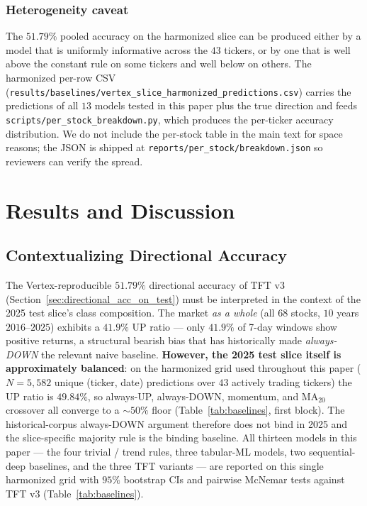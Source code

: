\documentclass[conference]{IEEEtran}
\begin{document}
\subsubsection{Heterogeneity caveat}

The $51.79\%$ pooled accuracy on the harmonized slice can be produced either by a model that is uniformly informative across the $43$ tickers, or by one that is well above the constant rule on some tickers and well below on others. The harmonized per-row CSV (\texttt{results/baselines/vertex\_slice\_harmonized\_predictions.csv}) carries the predictions of all $13$ models tested in this paper plus the true direction and feeds \texttt{scripts/per\_stock\_breakdown.py}, which produces the per-ticker accuracy distribution. We do not include the per-stock table in the main text for space reasons; the JSON is shipped at \texttt{reports/per\_stock/breakdown.json} so reviewers can verify the spread.

\section{Results and Discussion}\label{sec:results}

\subsection{Contextualizing Directional Accuracy}

The Vertex-reproducible $51.79\%$ directional accuracy of TFT v3 (Section~\ref{sec:directional_acc_on_test}) must be interpreted in the context of the 2025 test slice's class composition. The market \emph{as a whole} (all $68$ stocks, $10$ years $2016$--$2025$) exhibits a $41.9\%$ UP ratio --- only $41.9\%$ of 7-day windows show positive returns, a structural bearish bias that has historically made \emph{always-DOWN} the relevant naive baseline. \textbf{However, the 2025 test slice itself is approximately balanced}: on the harmonized grid used throughout this paper ($N=5{,}582$ unique (ticker, date) predictions over $43$ actively trading tickers) the UP ratio is $49.84\%$, so always-UP, always-DOWN, momentum, and MA$_{20}$ crossover all converge to a $\sim 50\%$ floor (Table~\ref{tab:baselines}, first block). The historical-corpus always-DOWN argument therefore does not bind in 2025 and the slice-specific majority rule is the binding baseline. All thirteen models in this paper --- the four trivial / trend rules, three tabular-ML models, two sequential-deep baselines, and the three TFT variants --- are reported on this single harmonized grid with $95\%$ bootstrap CIs and pairwise McNemar tests against TFT v3 (Table~\ref{tab:baselines}).
\end{document}
